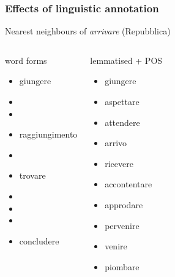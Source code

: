 \documentclass[t]{beamer} %
\begin{document}
\begin{frame}
  \frametitle{Effects of linguistic annotation}

  \centering
  Nearest neighbours of \emph{arrivare} (Repubblica)
  \ungap\footnotesize
  \begin{columns}[t]
    \column{4cm}
    \begin{block}{word forms}
      \begin{itemize}
      \item  giungere
      \item  {}
      \item  {}
      \item  raggiungimento
      \item  {}
      \item  trovare
      \item  {}
      \item  {}
      \item  {}
      \item  concludere
      \end{itemize}
    \end{block}
    \column{4cm}
    \begin{block}{lemmatised + POS}
      \begin{itemize}
      \item giungere
      \item aspettare
      \item attendere
      \item arrivo 
      \item ricevere
      \item accontentare
      \item approdare
      \item pervenire
      \item venire
      \item piombare
      \end{itemize}
    \end{block}
  \end{columns}
  
  \hfill{}
\end{frame}
\end{document}
